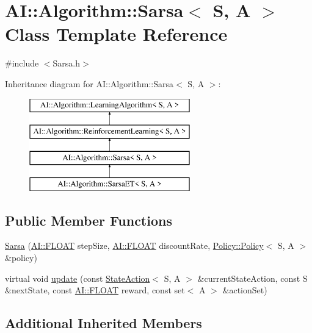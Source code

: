 \hypertarget{classAI_1_1Algorithm_1_1Sarsa}{\section{A\-I\-:\-:Algorithm\-:\-:Sarsa$<$ S, A $>$ Class Template Reference}
\label{classAI_1_1Algorithm_1_1Sarsa}
}


{\ttfamily \#include $<$Sarsa.\-h$>$}

Inheritance diagram for A\-I\-:\-:Algorithm\-:\-:Sarsa$<$ S, A $>$\-:\begin{figure}[H]
\begin{center}
\leavevmode
\includegraphics[height=4.000000cm]{classAI_1_1Algorithm_1_1Sarsa}
\end{center}
\end{figure}
\subsection*{Public Member Functions}
\begin{DoxyCompactItemize}
\item 
\hyperlink{classAI_1_1Algorithm_1_1Sarsa_a02dae564a53ea2284a23d047a8998fca}{Sarsa} (\hyperlink{namespaceAI_a41b74884a20833db653dded3918e05c3}{A\-I\-::\-F\-L\-O\-A\-T} step\-Size, \hyperlink{namespaceAI_a41b74884a20833db653dded3918e05c3}{A\-I\-::\-F\-L\-O\-A\-T} discount\-Rate, \hyperlink{classAI_1_1Algorithm_1_1Policy_1_1Policy}{Policy\-::\-Policy}$<$ S, A $>$ \&policy)
\item 
virtual void \hyperlink{classAI_1_1Algorithm_1_1Sarsa_ae1d62478d3e31cace3fb594e05f83d1c}{update} (const \hyperlink{classAI_1_1StateAction}{State\-Action}$<$ S, A $>$ \&current\-State\-Action, const S \&next\-State, const \hyperlink{namespaceAI_a41b74884a20833db653dded3918e05c3}{A\-I\-::\-F\-L\-O\-A\-T} reward, const set$<$ A $>$ \&action\-Set)
\end{DoxyCompactItemize}
\subsection*{Additional Inherited Members}


